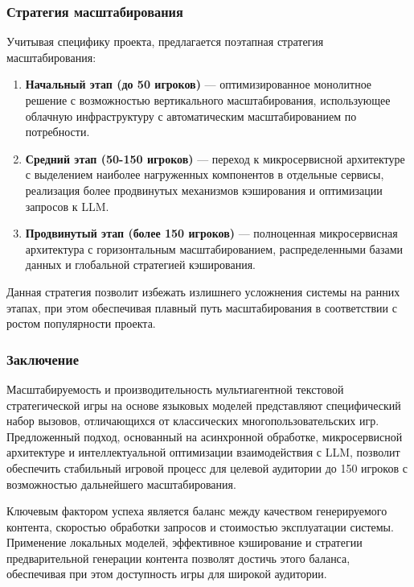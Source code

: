 \subsubsection{Стратегия масштабирования}

Учитывая специфику проекта, предлагается поэтапная стратегия масштабирования:

\begin{enumerate}
    \item \textbf{Начальный этап (до 50 игроков)} — оптимизированное монолитное решение с возможностью вертикального масштабирования, использующее облачную инфраструктуру с автоматическим масштабированием по потребности.

    \item \textbf{Средний этап (50-150 игроков)} — переход к микросервисной архитектуре с выделением наиболее нагруженных компонентов в отдельные сервисы, реализация более продвинутых механизмов кэширования и оптимизации запросов к LLM.

    \item \textbf{Продвинутый этап (более 150 игроков)} — полноценная микросервисная архитектура с горизонтальным масштабированием, распределенными базами данных и глобальной стратегией кэширования.
\end{enumerate}

Данная стратегия позволит избежать излишнего усложнения системы на ранних этапах, при этом обеспечивая плавный путь масштабирования в соответствии с ростом популярности проекта.

\subsubsection{Заключение}

Масштабируемость и производительность мультиагентной текстовой стратегической игры на основе языковых моделей представляют специфический набор вызовов, отличающихся от классических многопользовательских игр. Предложенный подход, основанный на асинхронной обработке, микросервисной архитектуре и интеллектуальной оптимизации взаимодействия с LLM, позволит обеспечить стабильный игровой процесс для целевой аудитории до 150 игроков с возможностью дальнейшего масштабирования.

Ключевым фактором успеха является баланс между качеством генерируемого контента, скоростью обработки запросов и стоимостью эксплуатации системы. Применение локальных моделей, эффективное кэширование и стратегии предварительной генерации контента позволят достичь этого баланса, обеспечивая при этом доступность игры для широкой аудитории.

